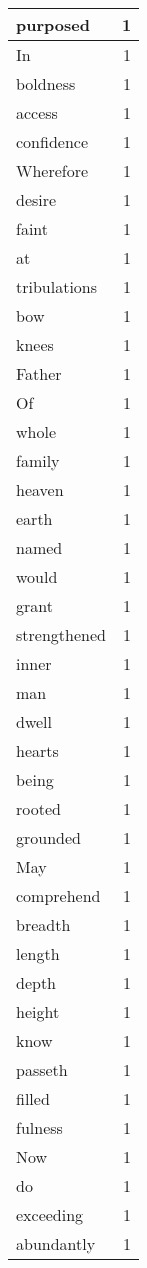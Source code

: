\begin{center}
\begin{longtable}{l|r}
purposed & 1\\ \hline 
In & 1\\ \hline 
boldness & 1\\ \hline 
access & 1\\ \hline 
confidence & 1\\ \hline 
Wherefore & 1\\ \hline 
desire & 1\\ \hline 
faint & 1\\ \hline 
at & 1\\ \hline 
tribulations & 1\\ \hline 
bow & 1\\ \hline 
knees & 1\\ \hline 
Father & 1\\ \hline 
Of & 1\\ \hline 
whole & 1\\ \hline 
family & 1\\ \hline 
heaven & 1\\ \hline 
earth & 1\\ \hline 
named & 1\\ \hline 
would & 1\\ \hline 
grant & 1\\ \hline 
strengthened & 1\\ \hline 
inner & 1\\ \hline 
man & 1\\ \hline 
dwell & 1\\ \hline 
hearts & 1\\ \hline 
being & 1\\ \hline 
rooted & 1\\ \hline 
grounded & 1\\ \hline 
May & 1\\ \hline 
comprehend & 1\\ \hline 
breadth & 1\\ \hline 
length & 1\\ \hline 
depth & 1\\ \hline 
height & 1\\ \hline 
know & 1\\ \hline 
passeth & 1\\ \hline 
filled & 1\\ \hline 
fulness & 1\\ \hline 
Now & 1\\ \hline 
do & 1\\ \hline 
exceeding & 1\\ \hline 
abundantly & 1\\ \hline 

\end{longtable}
\end{center}
